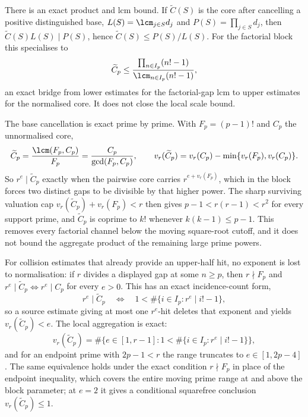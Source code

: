 There is an exact product and lcm bound.  If $\widetilde C(S)$ is the core
after cancelling a positive distinguished base, $L(S)=\lcm_{j\in S}d_j$ and
$P(S)=\prod_{j\in S}d_j$, then $\widetilde C(S)L(S)\mid P(S)$, hence
$\widetilde C(S)\le P(S)/L(S)$.  For the factorial block this specialises to
\[
 \widetilde C_p\le\frac{\prod_{n\in I_p}(n!-1)}{\lcm_{n\in I_p}(n!-1)},
\]
an exact bridge from lower estimates for the factorial-gap lcm to upper
estimates for the normalised core.  It does not close the local scale bound.

The base cancellation is exact prime by prime.  With $F_p=(p-1)!$ and $C_p$
the unnormalised core,
\[
 \widetilde C_p=\frac{\lcm(F_p,C_p)}{F_p}=\frac{C_p}{\gcd(F_p,C_p)},\qquad
 v_r(\widetilde C_p)=v_r(C_p)-\min\{v_r(F_p),v_r(C_p)\} .
\]
So $r^e\mid\widetilde C_p$ exactly when the pairwise core carries
$r^{e+v_r(F_p)}$, which in the block forces two distinct gaps to be divisible
by that higher power.  The sharp surviving valuation cap
$v_r(\widetilde C_p)+v_r(F_p)<r$ then gives $p-1<r(r-1)<r^2$ for every
support prime, and $\widetilde C_p$ is coprime to $k!$ whenever
$k(k-1)\le p-1$.  This removes every factorial channel below the moving
square-root cutoff, and it does not bound the aggregate product of the
remaining large prime powers.

For collision estimates that already provide an upper-half hit, no exponent
is lost to normalisation: if $r$ divides a displayed gap at some $n\ge p$,
then $r\nmid F_p$ and $r^e\mid\widetilde C_p\iff r^e\mid C_p$ for every
$e>0$.  This has an exact incidence-count form,
\[
 r^e\mid\widetilde C_p
 \quad\Longleftrightarrow\quad
 1<\#\{i\in I_p:r^e\mid i!-1\},
\]
so a source estimate giving at most one $r^e$-hit deletes that exponent and
yields $v_r(\widetilde C_p)<e$.  The local aggregation is exact:
\[
 v_r(\widetilde C_p)=\#\bigl\{e\in[1,r-1]:1<\#\{i\in I_p:r^e\mid i!-1\}\bigr\},
\]
and for an endpoint prime with $2p-1<r$ the range truncates to
$e\in[1,2p-4]$.  The same equivalence holds under the exact condition
$r\nmid F_p$ in place of the endpoint inequality, which covers the entire
moving prime range at and above the block parameter; at $e=2$ it gives a
conditional squarefree conclusion $v_r(\widetilde C_p)\le1$.

